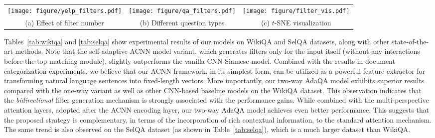 \documentclass[11pt,a4paper]{article}
\begin{document}
\begin{figure*} \centering
	\vspace{-2mm}
	\begin{tabular}{ccc}  
		\texttt{[image: figure/yelp\_filters.pdf]} & \hspace{-2mm}
		\texttt{[image: figure/qa\_filters.pdf]} &  \hspace{-2mm}
		\texttt{[image: figure/filter\_vis.pdf]} 
		\\
		\hspace{-0mm}
		(a) Effect of filter number \vspace{0mm}  & 
		\hspace{-0mm}
		(b) Different question types \hspace{-0mm}& 
		(c) $t$-SNE visualization  \hspace{-0mm}
\end{tabular}
	\vspace{-3mm}
	\caption{\small Comprehensive study of the proposed ACNN framework, including (a) the number of filters (Yelp dataset), and (b) performance \emph{vs} question types (WikiQA dataset), and (c) $t$-SNE visualization of learned filter weights (DBpedia dataset).}
	\vspace{-4mm}
	\label{fig:study}
\end{figure*}

Tables~\ref{tab:wikiqa} and \ref{tab:selqa} show experimental results of our models on WikiQA and SelQA datasets, along with other state-of-the-art methods. Note that the self-adaptive ACNN model variant, which generates filters only for the input itself (without any interactions before the top matching module), slightly outperforms the vanilla CNN Siamese model. Combined with the results in document categorization experiments, we believe that our ACNN framework, in its simplest form, can be utilized as a powerful feature extractor for transforming natural language sentences into fixed-length vectors. 
More importantly, our two-way AdaQA model exhibits superior results compared with the one-way variant as well as other CNN-based baseline models on the WikiQA dataset. This observation indicates that the \emph{bidirectional} filter generation mechanism is strongly associated with the performance gains. 
While combined with the multi-perspective attention layers, adopted after the ACNN encoding layer, our two-way AdaQA model achieves even better performance. This suggests that the proposed strategy is complementary, in terms of the incorporation of rich contextual information, to the standard attention mechanism.  The same trend is also observed on the SelQA dataset (as shown in Table~\ref{tab:selqa}), which is a much larger dataset than WikiQA. 
\end{document}
